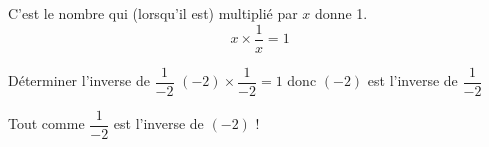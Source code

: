\begin{remarque}
  C'est le nombre qui (lorsqu'il est) multiplié par $x$ donne 1.
  $$x\times\frac{1}{x}=1$$
\end{remarque}

\begin{exemple*1}
  Déterminer l'inverse de $\dfrac{1}{-2}$
  \correction
  $(-2)\times \dfrac{1}{-2}=1$ donc $(-2)$ est l'inverse de $\dfrac{1}{-2 }$
  
  \begin{remarque}
    Tout comme $\dfrac{1}{-2 }$ est l'inverse de $(-2)$ !
  \end{remarque}
\end{exemple*1}

